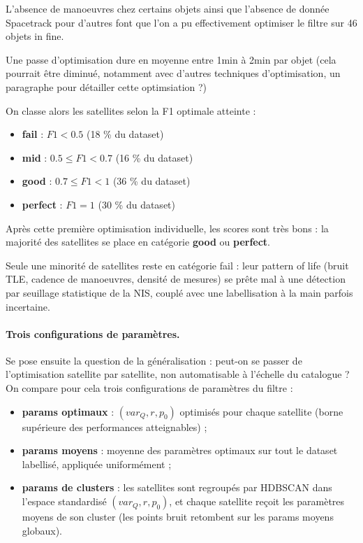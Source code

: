\documentclass{article}
\begin{document}
L'absence de manoeuvres chez certains objets ainsi que l'absence de donnée Spacetrack pour d'autres font que l'on a pu effectivement optimiser le filtre sur 46 objets in fine.

Une passe d'optimisation dure en moyenne entre 1min à 2min par objet (cela pourrait être diminué, notamment avec d'autres techniques d'optimisation, un paragraphe pour détailler cette optimsiation ?)

On classe alors les satellites selon la F1 optimale atteinte :
\begin{itemize}
    \item \textbf{fail} : $F1 < 0.5$  (18 \% du dataset)
    \item \textbf{mid} : $0.5 \leq F1 < 0.7$ (16 \% du dataset)
    \item \textbf{good} : $0.7 \leq F1 < 1$ (36 \% du dataset)
    \item \textbf{perfect} : $F1 = 1$ (30 \% du dataset)
\end{itemize}



Après cette première optimisation individuelle, les scores sont très bons : la majorité des satellites se place en catégorie \textbf{good} ou \textbf{perfect}.

Seule une minorité de satellites reste en catégorie fail : leur pattern of life (bruit TLE, cadence de manoeuvres, densité de mesures) se prête mal à une détection par seuillage statistique de la NIS, couplé avec une labellisation à la main parfois incertaine.

\paragraph{Trois configurations de paramètres.}
Se pose ensuite la question de la généralisation : peut-on se passer de l'optimisation satellite par satellite, non automatisable à l'échelle du catalogue ? On compare pour cela trois configurations de paramètres du filtre :
\begin{itemize}
    \item \textbf{params optimaux} : $(var_Q, r, p_0)$ optimisés pour chaque satellite (borne supérieure des performances atteignables) ;
    \item \textbf{params moyens} : moyenne des paramètres optimaux sur tout le dataset labellisé, appliquée uniformément ;
    \item \textbf{params de clusters} : les satellites sont regroupés par HDBSCAN dans l'espace standardisé $(var_Q, r, p_0)$, et chaque satellite reçoit les paramètres moyens de son cluster (les points bruit retombent sur les params moyens globaux).
\end{itemize}
\end{document}

